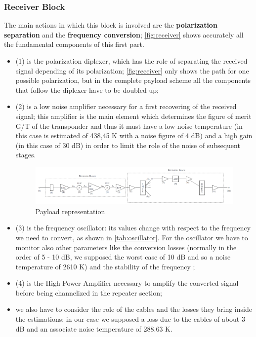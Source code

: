 \documentclass[11pt,a4paper,titlepage]{article}
\begin{document}
		\subsubsection{Receiver Block}
The main actions in which this block is involved are the \textbf{polarization separation} and the \textbf{frequency conversion}; \autoref{fig:receiver} shows accurately all the fundamental components of this first part.
		\begin{itemize}
		\item (1) is the polarization diplexer, which has the role of separating the received signal depending of its polarization; \autoref{fig:receiver} only shows the path for one possible polarization, but in the complete payload scheme all the components that follow the diplexer have to be doubled up;
		\item (2) is a low noise amplifier necessary for a first recovering of the received signal; this amplifier is the main element which determines the figure of merit G/T of the transponder and thus it must have a low noise temperature (in this case is estimated of 438,45 K with a noise figure of 4 dB) and a high gain (in this case of 30 dB) in order to limit the role of the noise of subsequent stages.
		\begin{figure}
		\centering
		\includegraphics[width = 1\textwidth]{Payload.png}
		\caption{Payload representation}
		\label{fig:payload}
		\end{figure}
		\item (3) is the frequency oscillator: its values change with respect to the frequency we need to convert, as shown in \autoref{tab:oscillator}. For the oscillator we have to monitor also other parameters like the conversion losses (normally in the order of 5 - 10 dB, we supposed the worst case of 10 dB and so a noise temperature of 2610 K) and the stability of the frequency \cite{Maral2017};	
		\item (4) is the High Power Amplifier necessary to amplify the converted signal before being channelized in the repeater section;
		\item we also have to consider the role of the cables and the losses they bring inside the estimations; in our case we supposed a loss due to the cables of about 3 dB and an associate noise temperature of 288.63 K.
		\end{itemize}
\end{document}
